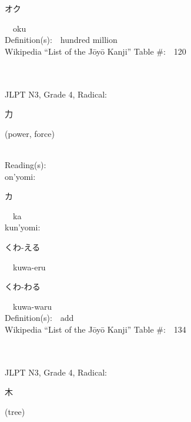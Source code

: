 \begin{multicols}{2}
{\hspace*{2em}}{\begin{CJK}{UTF8}{min} オク \end{CJK}}\ \ oku\ \ \\
Definition(s):\ \ hundred million \\
Wikipedia ``List of the J\=oy\=o Kanji'' Table \#:\ \ 120 \\
\ \ \\
{\fontsize{34pt}{40pt}  }\ \ \\  %
{JLPT N3, Grade 4, Radical:\ \ {\begin{CJK}{UTF8}{min} 力 \end{CJK}} (power, force) } \\
Reading(s):\ \ \\
{\hspace*{1em}}on'yomi:\ \ \\
{\hspace*{2em}}{\begin{CJK}{UTF8}{min} カ \end{CJK}}\ \ ka\ \ \\
{\hspace*{1em}}kun'yomi:\ \ \\
{\hspace*{2em}}{\begin{CJK}{UTF8}{min} くわ-える \end{CJK}}\ \ kuwa-eru\ \ \\
{\hspace*{2em}}{\begin{CJK}{UTF8}{min} くわ-わる \end{CJK}}\ \ kuwa-waru\ \ \\
Definition(s):\ \ add \\
Wikipedia ``List of the J\=oy\=o Kanji'' Table \#:\ \ 134 \\
\ \ \\
{\fontsize{34pt}{40pt}  }\ \ \\  %
{JLPT N3, Grade 4, Radical:\ \ {\begin{CJK}{UTF8}{min} 木 \end{CJK}} (tree) } \\

\end{multicols}
